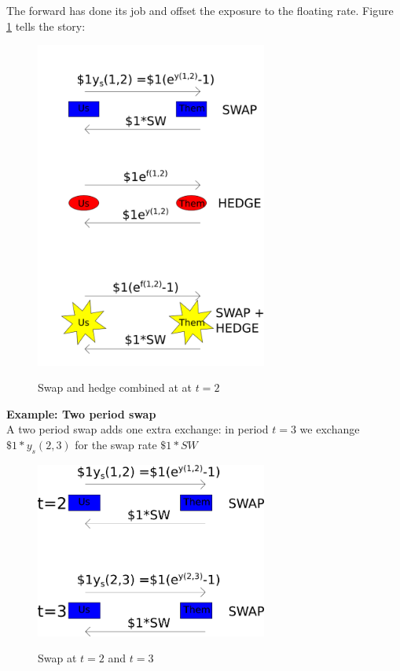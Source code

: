 The forward has done its job and offset the exposure to the floating rate. Figure \ref{swapAndHedge} tells the story:

\begin{figure}[htbp]
\begin{center}
  \includegraphics[width=3in]{pics/swapAndHedge.png} \\
  \caption{Swap and hedge combined at at $t=2$}
\label{swapAndHedge}
\end{center}
\end{figure}


\textbf{Example: Two period swap}\\

A two period swap adds one extra exchange: in period $t=3$ we exchange $\$1*y_s(2,3)$ for the swap rate $\$1*SW$ 

\begin{figure}[htbp]
\begin{center}
  \includegraphics[width=3in]{pics/swap2P.png} \\
  \caption{Swap at $t=2$ and $t=3$}
\label{swap2P}
\end{center}
\end{figure}

